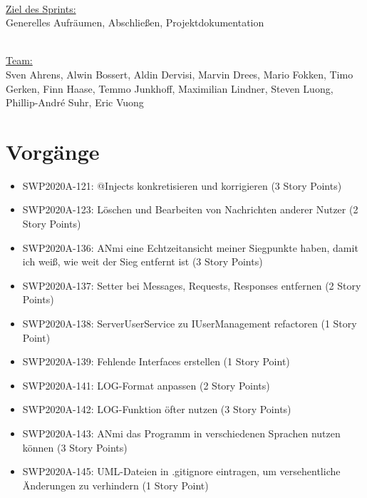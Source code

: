 \documentclass[12pt,a4paper, oneside]{article}
\begin{document}
    \noindent
    \\
    \underline{Ziel des Sprints:}
    \\
    Generelles Aufräumen, Abschließen, Projektdokumentation

    \noindent
    \\
    \underline {Team:}
    \\
    Sven Ahrens, Alwin Bossert, Aldin Dervisi, Marvin Drees, Mario Fokken,
    Timo Gerken, Finn Haase, Temmo Junkhoff, Maximilian Lindner, Steven Luong, Phillip-André Suhr, Eric Vuong


    \section{Vorgänge}

    \begin{itemize}
        \item SWP2020A-121: @Injects konkretisieren und korrigieren (3 Story Points)

        \item SWP2020A-123: Löschen und Bearbeiten von Nachrichten anderer Nutzer (2 Story Points)

        \item SWP2020A-136: ANmi eine Echtzeitansicht meiner Siegpunkte haben, damit ich weiß, wie weit der Sieg entfernt ist (3 Story Points)

        \item SWP2020A-137: Setter bei Messages, Requests, Responses entfernen (2 Story Points)

        \item SWP2020A-138: ServerUserService zu IUserManagement refactoren (1 Story Point)

        \item SWP2020A-139: Fehlende Interfaces erstellen (1 Story Point)

        \item SWP2020A-141: LOG-Format anpassen     (2 Story Points)

        \item SWP2020A-142: LOG-Funktion öfter nutzen (3 Story Points)

        \item SWP2020A-143: ANmi das Programm in verschiedenen Sprachen nutzen können    (3 Story Points)

        \item SWP2020A-145: UML-Dateien in .gitignore eintragen, um versehentliche Änderungen zu verhindern    (1 Story Point)


\end{itemize}
\end{document}
